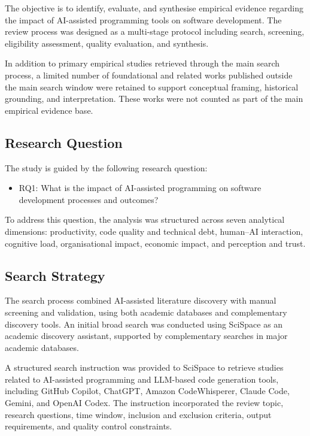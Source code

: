 \documentclass[conference]{IEEEtran}
\begin{document}
The objective is to identify, evaluate, and synthesise empirical evidence regarding the impact of AI-assisted programming tools on software development. The review process was designed as a multi-stage protocol including search, screening, eligibility assessment, quality evaluation, and synthesis.

In addition to primary empirical studies retrieved through the main search process, a limited number of foundational and related works published outside the main search window were retained to support conceptual framing, historical grounding, and interpretation. These works were not counted as part of the main empirical evidence base.

\subsection{Research Question}

The study is guided by the following research question:

\begin{itemize}
    \item RQ1: What is the impact of AI-assisted programming on software development processes and outcomes?
\end{itemize}

To address this question, the analysis was structured across seven analytical dimensions: productivity, code quality and technical debt, human--AI interaction, cognitive load, organisational impact, economic impact, and perception and trust.

\subsection{Search Strategy}

The search process combined AI-assisted literature discovery with manual screening and validation, using both academic databases and complementary discovery tools. An initial broad search was conducted using SciSpace as an academic discovery assistant, supported by complementary searches in major academic databases.

A structured search instruction was provided to SciSpace to retrieve studies related to AI-assisted programming and LLM-based code generation tools, including GitHub Copilot, ChatGPT, Amazon CodeWhisperer, Claude Code, Gemini, and OpenAI Codex. The instruction incorporated the review topic, research questions, time window, inclusion and exclusion criteria, output requirements, and quality control constraints.
\end{document}
